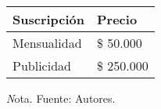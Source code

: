 \begin{adjustbox}{
            center,
            caption=[{Precios de suscripción.}]{Precios de suscripción mensual y publicidad. },
            label={PrecioPeriodos},
            nofloat=table, vspace={20px}}
            {
            \begin{threeparttable}
           \begin{tabular}{|p{7.8cm}|p{7.8cm}|}
            \hline
            \rowcolor[HTML]{D9EAD3} 
            Suscripción & Precio       \\ \hline
            Mensualidad & \$ 50.000    \\ \hline
            Publicidad   & \$ 250.000   \\ \hline
        
            \end{tabular}%
            
            \begin{tablenotes}
                \vspace{2mm}
                \textit Nota. Fuente: Autores.
            \end{tablenotes}
            
        \end{threeparttable} 
    }
\end{adjustbox}
